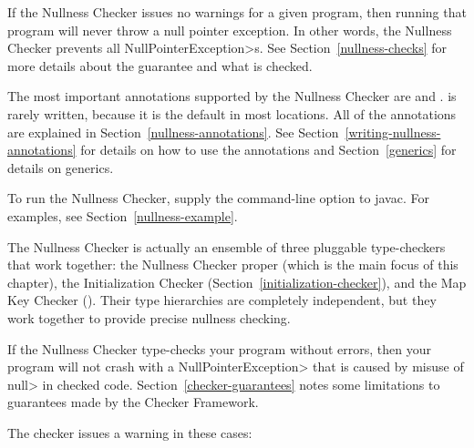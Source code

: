 \htmlhr
{}

If the Nullness Checker issues no warnings for a given program, then
running that program will never throw a null pointer exception.  In
other words, the Nullness Checker prevents all \<NullPointerException>s.
See Section~\ref{nullness-checks} for more details about
the guarantee and what is checked.

The most important annotations supported by the Nullness Checker are
 and
.
 is rarely written, because it is
the default in most locations.  All of the annotations are explained in
Section~\ref{nullness-annotations}.
See Section~\ref{writing-nullness-annotations} for details on how to
use the annotations and Section~\ref{generics} for details on
generics.

To run the Nullness Checker, supply the
command-line option to javac.  For
examples, see Section~\ref{nullness-example}.

The Nullness Checker is actually an ensemble of three pluggable
type-checkers that work together: the Nullness Checker proper (which is the
main focus of this chapter), the Initialization Checker
(Section~\ref{initialization-checker}), and the Map Key Checker
().
Their type hierarchies are completely independent, but they work together
to provide precise nullness checking.




If the Nullness Checker type-checks your program without errors, then your
program will not crash with a \<NullPointerException> that is caused by
misuse of \<null> in checked code.
%
Section~\ref{checker-guarantees} notes some limitations to guarantees made
by the Checker Framework.

The checker issues a warning in these cases:

